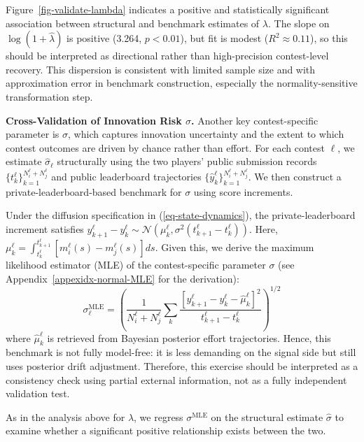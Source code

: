 \documentclass[mnsc]{informs3}
\begin{document}
Figure~\ref{fig-validate-lambda} indicates a positive and statistically significant association between structural and benchmark estimates of $\lambda$.
The slope on $\log(1+\hat\lambda)$ is positive (3.264, $p<0.01$), but fit is modest ($R^2\approx0.11$), so this should be interpreted as directional rather than high-precision contest-level recovery.
This dispersion is consistent with limited sample size and with approximation error in benchmark construction, especially the normality-sensitive transformation step.




\textbf{Cross-Validation of Innovation Risk $\sigma$.}
Another key contest-specific parameter is $\sigma$, which captures innovation uncertainty and the extent to which contest outcomes are driven by chance rather than effort.
For each contest $\ell$, we estimate $\hat{\sigma}_\ell$ structurally using the two players’ public submission records $\{t_k^\ell\}_{k=1}^{N_i^\ell+N_j^\ell}$ and public leaderboard trajectories $\{\hat y_k^\ell\}_{k=1}^{N_i^\ell+N_j^\ell}$.
We then construct a private-leaderboard-based benchmark for $\sigma$ using score increments.

Under the diffusion specification in (\ref{eq-state-dynamics}), the private-leaderboard increment satisfies
$y^\ell_{k+1} - y^\ell_{k} \sim \mathcal{N}\left(\mu^\ell_k, \sigma^2(t^\ell_{k+1}-t^\ell_k)\right)$.
Here, $\mu^\ell_k = \int^{t^\ell_{k+1}}_{t^\ell_k}\left[m^\ell_i(s) - m^\ell_j(s)\right]ds$.
Given this, we derive the maximum likelihood estimator (MLE) of the contest-specific parameter $\sigma$ (see Appendix~\ref{appexidx-normal-MLE} for the derivation):
\begin{equation*}
\sigma^{\text{MLE}}_\ell = \left(\frac{1}{N^\ell_i+N^\ell_j}\sum_k\frac{\left[y^\ell_{k+1}-y^\ell_{k}-\hat\mu^\ell_k\right]^2}{t^\ell_{k+1}-t^\ell_k}\right)^{1/2}
\end{equation*}
where $\hat\mu^\ell_k$ is retrieved from Bayesian posterior effort trajectories.
Hence, this benchmark is not fully model-free: it is less demanding on the signal side but still uses posterior drift adjustment.
Therefore, this exercise should be interpreted as a consistency check using partial external information, not as a fully independent validation test.

As in the analysis above for $\lambda$, we regress $\sigma^{\text{MLE}}$ on the structural estimate $\hat{\sigma}$ to examine whether a significant positive relationship exists between the two.
\end{document}
